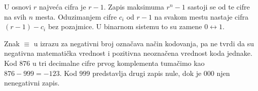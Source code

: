 
U osnovi $r$ najveća cifra je $r-1$. Zapis maksimuma $r^n-1$ sastoji se od te cifre na svih $n$ mesta. Oduzimanjem cifre $c_i$ od $r-1$ na svakom mestu nastaje cifra $(r-1)-c_i$ bez pozajmice. U binarnom sistemu to su zamene $0\leftrightarrow1$.

Znak $\equiv$ u izrazu za negativni broj označava način kodovanja, pa ne tvrdi da su negativna matematička vrednost i pozitivna neoznačena vrednost koda jednake. Kod $876$ u tri decimalne cifre prvog komplementa tumačimo kao $876-999=-123$. Kod $999$ predstavlja drugi zapis nule, dok je $000$ njen nenegativni zapis.
